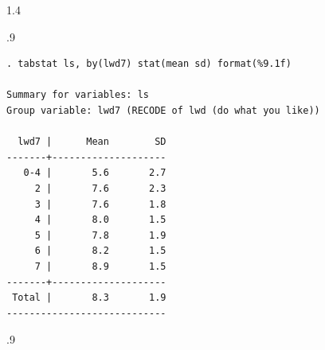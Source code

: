 \documentclass[10pt, letterpaper]{article}
\begin{document}
\begin{spacing}{1.4}


\begin{scriptsize}
\begin{spacing}{.9} 
\begin{verbatim}
. tabstat ls, by(lwd7) stat(mean sd) format(%9.1f)

Summary for variables: ls
Group variable: lwd7 (RECODE of lwd (do what you like))

  lwd7 |      Mean        SD
-------+--------------------
   0-4 |       5.6       2.7
     2 |       7.6       2.3
     3 |       7.6       1.8
     4 |       8.0       1.5
     5 |       7.8       1.9
     6 |       8.2       1.5
     7 |       8.9       1.5
-------+--------------------
 Total |       8.3       1.9
----------------------------
\end{verbatim}
\end{spacing}{.9}
\end{scriptsize}




\end{spacing}
\end{document}
